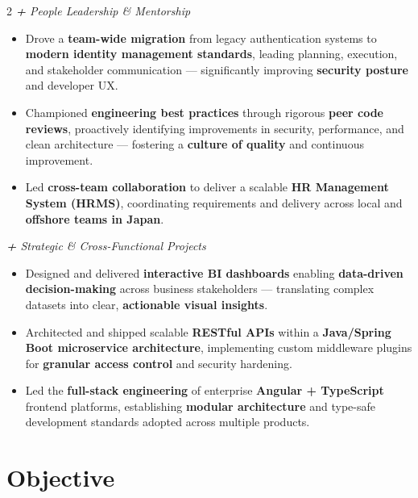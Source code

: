 \documentclass[11pt,a4paper]{article}
\begin{document}
\begin{paracol}{2}
  \vspace{2pt}
  {\small\textit{\textcolor{accentblue}{\textbf{+} People Leadership \& Mentorship}}}
  \begin{itemize}[leftmargin=1.2em, itemsep=2pt, topsep=2pt]
    \item Drove a \textbf{team-wide migration} from legacy authentication systems to \textbf{modern identity management standards}, leading planning, execution, and stakeholder communication --- significantly improving \textbf{security posture} and developer UX.
    \item Championed \textbf{engineering best practices} through rigorous \textbf{peer code reviews}, proactively identifying improvements in security, performance, and clean architecture --- fostering a \textbf{culture of quality} and continuous improvement.
    \item Led \textbf{cross-team collaboration} to deliver a scalable \textbf{HR Management System (HRMS)}, coordinating requirements and delivery across local and \textbf{offshore teams in Japan}.
  \end{itemize}

  \vspace{2pt}
  {\small\textit{\textcolor{accentblue}{\textbf{+} Strategic \& Cross-Functional Projects}}}
  \begin{itemize}[leftmargin=1.2em, itemsep=2pt, topsep=2pt]
    \item Designed and delivered \textbf{interactive BI dashboards} enabling \textbf{data-driven decision-making} across business stakeholders --- translating complex datasets into clear, \textbf{actionable visual insights}.
    \item Architected and shipped scalable \textbf{RESTful APIs} within a \textbf{Java/Spring Boot microservice architecture}, implementing custom middleware plugins for \textbf{granular access control} and security hardening.
    \item Led the \textbf{full-stack engineering} of enterprise \textbf{Angular + TypeScript} frontend platforms, establishing \textbf{modular architecture} and type-safe development standards adopted across multiple products.
  \end{itemize}

  \switchcolumn

  \section{Objective}


\end{paracol}
\end{document}
